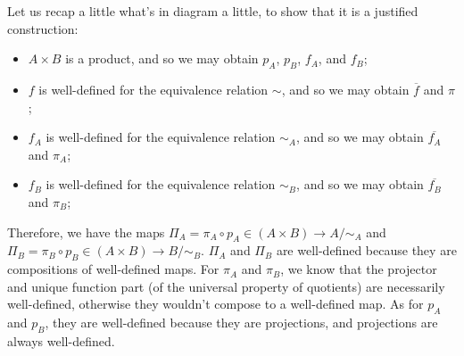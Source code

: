 \documentclass[12pt, letterpaper, twoside]{report}
\begin{document}

Let us recap a little what's in diagram a little, to show that it is a justified construction:
\begin{itemize}
	\item $A \times B$ is a product, and so we may obtain $p_A$, $p_B$, $f_A$, and $f_B$;
    \item $f$ is well-defined for the equivalence relation $\sim$, and so we may obtain $\overline{f}$ and $\pi$;
    \item $f_A$ is well-defined for the equivalence relation $\sim_A$, and so we may obtain $\overline{f_A}$ and $\pi_A$;
    \item $f_B$ is well-defined for the equivalence relation $\sim_B$, and so we may obtain $\overline{f_B}$ and $\pi_B$;
\end{itemize}

Therefore, we have the maps $\Pi_A = \pi_A \circ p_A \in (A \times B) \to A/\sim_A$ and $\Pi_B = \pi_B \circ p_B \in (A \times B) \to B/\sim_B$. $\Pi_A$ and $\Pi_B$ are well-defined because they are compositions of well-defined maps. For $\pi_A$ and $\pi_B$, we know that the projector and unique function part (of the universal property of quotients) are necessarily well-defined, otherwise they wouldn't compose to a well-defined map. As for $p_A$ and $p_B$, they are well-defined because they are projections, and projections are always well-defined.
\end{document}
